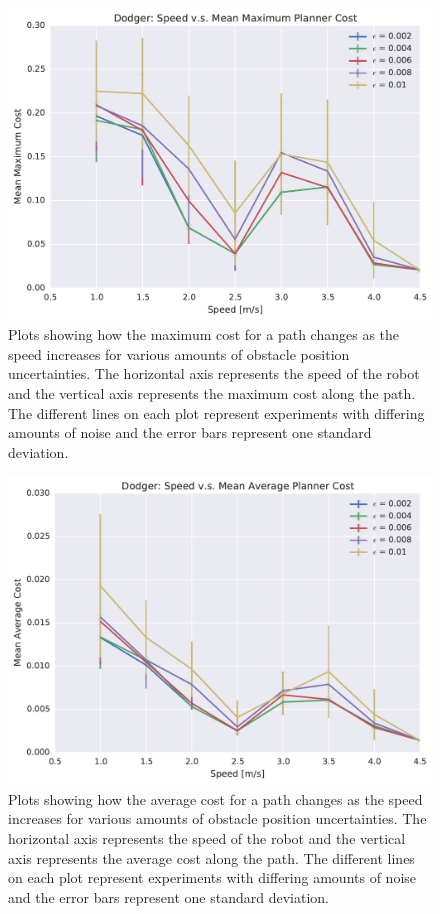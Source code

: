 \begin{figure}[h!]
    \centering

    \includegraphics[width=0.80\linewidth]{figs/planner_mean_max_cost_1}

    \caption{Plots showing how the maximum cost for a path changes as the
        speed increases for various amounts of obstacle position uncertainties.
        The horizontal axis represents the speed of the robot and the vertical
        axis represents the maximum cost along the path. The different lines on
    each plot represent experiments with differing amounts of noise and the
error bars represent one standard deviation.}

\end{figure}

\begin{figure}[h!]
    \centering

    \includegraphics[width=0.80\linewidth]{figs/planner_mean_avg_cost_1}

    \caption{Plots showing how the average cost for a path changes as the
        speed increases for various amounts of obstacle position uncertainties.
        The horizontal axis represents the speed of the robot and the vertical
        axis represents the average cost along the path. The different lines on
    each plot represent experiments with differing amounts of noise and the
error bars represent one standard deviation.}

\end{figure}

